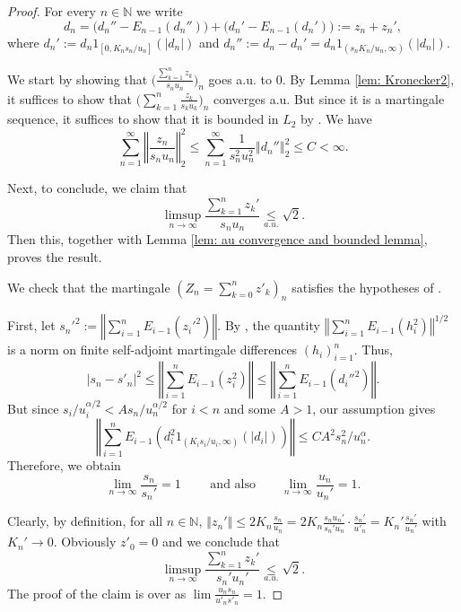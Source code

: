 \documentclass[10pt]{amsart}
\theoremstyle{definition}
\theoremstyle{myremark}
\numberwithin{equation}{section}
\def\N{\mathbb N}
\newcommand{\abs}[1]{\left\vert#1\right\vert}
\newcommand{\norm}[1]{\left\Vert#1\right\Vert}
\begin{document}
\begin{proof}
For every $n \in \N$ we write 
\[
d_n= \big(d_n''-E_{n-1}(d_n'')\big) + \big(d_n' - E_{n-1}(d_n')\big):=z_n + z_n' ,
\]
where $d_n':= d_n 1_{[0, K_ns_n/u_n]}(\abs{d_n})$ and $d_n'':= d_n - d_n'=d_n {1}_{(s_n K_n/u_n,\infty)}(|d_n|) $. 

We start by showing that $\Big(\frac{\sum_{k=1} ^nz_k}{s_n u_n}\Big)_n$ goes a.u. to 0. By Lemma \ref{lem: Kronecker2}, it suffices to show that $\Big(\sum_{k=1} ^n\frac{z_k}{s_k u_k}\Big)_n$ converges a.u. But since it is a martingale sequence, it suffices to show that it is bounded in $L_2$ by \cite{cuculescu1971martingales}. We have
$$ \sum_{n=1}^\infty \norm{\frac{z_n}{s_n u_n}}_2^2\leq \sum_{n=1}^\infty \frac 1{s_n^2u_n^2}\norm{{d_n''}}_2^2\leq C  <\infty.$$

    Next, to conclude, we claim that
    \[
    \limsup_{n \to \infty} \frac{\sum_{k=1}^n z_k'}{s_n u_n}  \underset{a.u.}{\leq }\sqrt{2}.
    \]
    Then this, together with Lemma \ref{lem: au convergence and bounded lemma}, proves the result.

      We  check that the martingale $(Z_n=\sum_{k=0}^nz'_k)_n$
      satisfies the hypotheses of .
      
  First, let   $s_n'^2:= \norm{\sum_{i=1}^{n} E_{i-1}(z_i'^2)}$. 
  By \cite{junge2002doob}, the quantity $\norm{\sum_{i=1}^n E_{i-1} (h_i^2)}^{1/2}$ is a norm on finite self-adjoint martingale differences $(h_i)_{i=1}^n$. Thus, 
  $$|s_n -s'_n|^2 \leq   \norm{\sum_{i=1}^{n} E_{i-1}(z_i^2)}\leq \norm{\sum_{i=1}^{n} E_{i-1}(d_i''^2)}.$$
      But since $s_i/u_i^{\alpha/2}<A s_n/u_n^{\alpha/2}$ for $i<n$ and some  $A>1$, our assumption gives
    \[
    \norm{\sum_{i=1}^{n} E_{i-1} (d_i^2 1_{(K_is_i/u_i, \infty)} (\abs{d_i}) )} \leq CA^2 s_n^2/u_n^\alpha.
    \]
    Therefore, we obtain
        \begin{equation*}\label{eq: s_n and s_n dash limit}
        \lim_{n\to \infty}\frac{s_n}{s_n'}=1 
        \qquad \textrm{ and also}\qquad \lim\limits_{n\to \infty}\frac{u_n}{u_n'}=1.
    \end{equation*}
        
    Clearly, by definition, for all $n \in \N$, $\norm{z_n'} \leq 2 K_n \frac{s_n}{u_n}= 2 K_n \frac{s_n u_n'}{s_n'u_n} \cdot \frac{s_n'}{u'_n} = K_n' \frac{s_n'}{u_n'}$ with $K_n'\to 0$. Obviously $z'_0=0$ and we conclude that { 
    \begin{equation*}\label{eq: au less sqrt 2}
        \limsup_{n\to \infty} \frac{\sum_{k=1}^{n}z_k'}{s_n' u_n'}\underset{a.u.}{\leq }\sqrt{2}.
    \end{equation*}The proof of the claim is over as $\lim \frac{u_ns_n}{u'_ns'_n}=1$.}
  \end{proof}  
  
\end{document}

